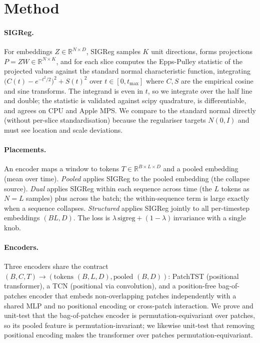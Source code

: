 \documentclass[11pt]{article}
\begin{document}
\section{Method}

\paragraph{SIGReg.} For embeddings $Z \in \mathbb{R}^{N\times D}$, SIGReg samples $K$ unit
directions, forms projections $P = ZW \in \mathbb{R}^{N\times K}$, and for each slice computes the
Epps-Pulley statistic \citep{eppspulley1983} of the projected values against the standard normal
characteristic function, integrating $\big(C(t) - e^{-t^2/2}\big)^2 + S(t)^2$ over $t\in[0,t_{\max}]$
where $C,S$ are the empirical cosine and sine transforms. The integrand is even in $t$, so we
integrate over the half line and double; the statistic is validated against scipy quadrature, is
differentiable, and agrees on CPU and Apple MPS. We compare to the standard normal directly
(without per-slice standardisation) because the regulariser targets $N(0,I)$ and must see location
and scale deviations.

\paragraph{Placements.} An encoder maps a window to tokens $T\in\mathbb{R}^{B\times L\times D}$ and
a pooled embedding (mean over time). \emph{Pooled} applies SIGReg to the pooled embedding (the
collapse source). \emph{Dual} applies SIGReg within each sequence across time (the $L$ tokens as
$N=L$ samples) plus across the batch; the within-sequence term is large exactly when a sequence
collapses. \emph{Structured} applies SIGReg jointly to all per-timestep embeddings $(B L, D)$. The
loss is $\lambda\,\mathrm{sigreg} + (1-\lambda)\,\mathrm{invariance}$ with a single knob.

\paragraph{Encoders.} Three encoders share the contract $(B,C,T)\to(\text{tokens }(B,L,D),
\text{pooled }(B,D))$: PatchTST \citep{patchtst2023} (positional transformer), a TCN
\citep{tcn2018} (positional via convolution), and a position-free bag-of-patches encoder that
embeds non-overlapping patches independently with a shared MLP and no positional encoding or
cross-patch interaction. We prove and unit-test that the bag-of-patches encoder is
permutation-equivariant over patches, so its pooled feature is permutation-invariant; we likewise
unit-test that removing positional encoding makes the transformer over patches
permutation-equivariant.
\end{document}
